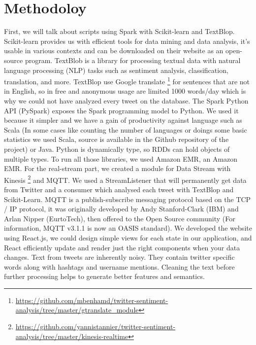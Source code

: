\documentclass{acmtog} %
\begin{document}
\section{Methodoloy}
\label{sec:methodology}

First, we will talk about scripts using Spark with Scikit-learn and TextBlop. Scikit-learn provides us with efficient tools for data mining and data analysis, it’s usable in various contexts and can be downloaded on their website as an open-source program. TextBlob is a library for processing textual data with natural language processing (NLP) tasks such as sentiment analysis, classification, translation, and more. TextBlop use Google translate \footnote{\url{https://github.com/mbenhamd/twitter-sentiment-analysis/tree/master/gtranslate_module}} for sentences that are not in English, so in free and anonymous usage are limited 1000 words/day which is why we could not have analyzed every tweet on the database. The Spark Python API (PySpark) exposes the Spark programming model to Python. We used it because it simpler and we have a gain of productivity against language such as Scala (In some cases like counting the number of languages or doings some basic statistics we used Scala, source is available in the Github repository of the project) or Java. Python is dynamically type, so RDDs can hold objects of multiple types. To run all those libraries, we used Amazon EMR, an Amazon EMR. For the real-stream part, we created a module for Data Stream with Kinesis \footnote{\url{https://github.com/yannistannier/twitter-sentiment-analysis/tree/master/kinesis-realtime}} and MQTT. We used a StreamListener that will permanently get data from Twitter and a consumer which analysed each tweet with TextBlop and Scikit-Learn.
MQTT is a publish-subscribe messaging protocol based on the TCP / IP protocol, it was originally developed by Andy Stanford-Clark (IBM) and Arlan Nipper (EurtoTech), then offered to the Open Source community (For information, MQTT v3.1.1 is now an OASIS standard). We developed the website using React.js, we could design simple views for each state in our application, and React efficiently update and render just the right components when your data changes. Text from tweets are inherently noisy. They contain twitter specific words along with hashtags and username mentions. Cleaning the text before further processing helps to generate better features and semantics.
\end{document}

